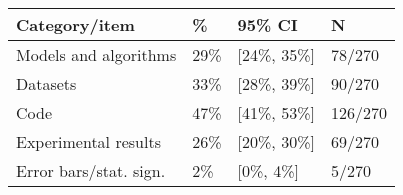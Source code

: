 \begin{tabular}{llll}
\hline
Category/item & \% & 95\% CI  & N \\
\hline
Models and algorithms & 29\% & [24\%, 35\%] & 78/270\\
Datasets & 33\% & [28\%, 39\%] & 90/270\\
Code & 47\% & [41\%, 53\%] & 126/270\\
Experimental results & 26\% & [20\%, 30\%] & 69/270\\
Error bars/stat. sign.& 2\% & [0\%, 4\%] & 5/270\\
\hline
\end{tabular}
